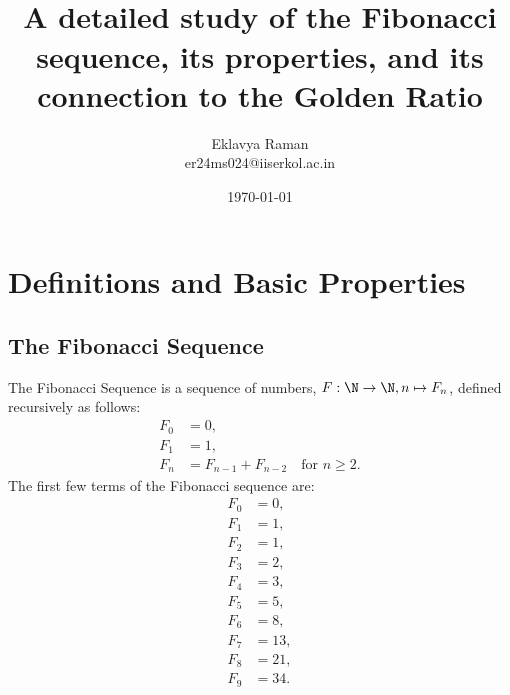 \documentclass[openany]{book}
\begin{document}
\title{\Large{} \\ \vspace{5pt} 
\large{A detailed study of the Fibonacci sequence, its properties, and its connection to the Golden Ratio}}
\author{Eklavya Raman \\ \vspace{5pt} er24ms024@iiserkol.ac.in \\ \vspace{5pt}}
\date{\today}
\maketitle
\tableofcontents
\listoftheorems[
    show=mytheorem,
    title={List of Theorems}]
\chapter{Definitions and Basic Properties}
\section{The Fibonacci Sequence}
The Fibonacci Sequence is a sequence of numbers, $F: \N \to \N, n \mapsto F_n$, defined recursively as follows: 
\begin{align*}
    F_0 &= 0, \\
    F_1 &= 1, \\
    F_n &= F_{n-1} + F_{n-2} \quad \text{for } n \geq 2.
\end{align*}
The first few terms of the Fibonacci sequence are:
\begin{align*}
    F_0 &= 0, \\
    F_1 &= 1, \\
    F_2 &= 1, \\
    F_3 &= 2, \\
    F_4 &= 3, \\
    F_5 &= 5, \\
    F_6 &= 8, \\
    F_7 &= 13, \\
    F_8 &= 21, \\
    F_9 &= 34.
\end{align*}
\end{document}
